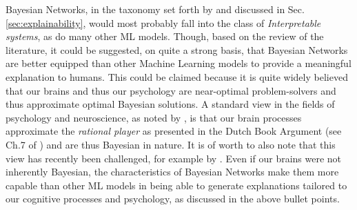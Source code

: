 Bayesian Networks, in the taxonomy set forth by \cite{Doran2018} and discussed in Sec. \ref{sec:explainability}, would most probably fall into the class of \textit{Interpretable systems}, as do many other ML models.
Though, based on the review of the literature, it could be suggested, on quite a strong basis, that Bayesian Networks are better equipped than other Machine Learning models to provide a meaningful explanation to humans.
This could be claimed because it is quite widely believed that our brains and thus our psychology are near-optimal problem-solvers and thus approximate optimal Bayesian solutions.
A standard view in the fields of psychology and neuroscience, as noted by \cite{Bowers2012}, is that our brain processes approximate the \textit{rational player} as presented in the Dutch Book Argument (see Ch.7 of \cite{anand2009handbook}) and are thus Bayesian in nature.
It is of worth to also note that this view has recently been challenged, for example by \cite{Bowers2012}.
Even if our brains were not inherently Bayesian, the characteristics of Bayesian Networks make them more capable than other ML models in being able to generate explanations tailored to our cognitive processes and psychology, as discussed in the above bullet points.
